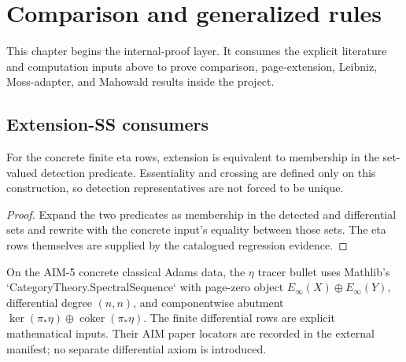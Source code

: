 \chapter{Comparison and generalized rules}
\label{chap:comparison-and-rules}

This chapter begins the internal-proof layer.  It consumes the explicit literature and computation inputs above to prove comparison, page-extension, Leibniz, Moss-adapter, and Mahowald results inside the project.

\section{Extension-SS consumers}

\begin{proposition}
  \label{prop:classical-eta-extension-iff-detected}
  \notready
  For the concrete finite eta rows, extension is equivalent to membership in
  the set-valued detection predicate.  Essentiality and crossing are defined
  only on this construction, so detection representatives are not forced to
  be unique.
\end{proposition}

\begin{proof}
  Expand the two predicates as membership in the detected and differential
  sets and rewrite with the concrete input's equality between those sets.
  The eta rows themselves are supplied by the catalogued regression evidence.
\end{proof}

\begin{definition}
  \label{def:classical-eta-ess-concrete}
  \notready
  On the AIM-5 concrete classical Adams data, the $\eta$ tracer bullet uses
  Mathlib's `CategoryTheory.SpectralSequence` with page-zero object
  $E_\infty(X)\oplus E_\infty(Y)$, differential degree $(n,n)$, and
  componentwise abutment $\ker(\pi_*\eta)\oplus\operatorname{coker}(\pi_*\eta)$.
  The finite differential rows are explicit mathematical inputs. Their AIM
  paper locators are recorded in the external manifest; no separate
  differential axiom is introduced.
\end{definition}

